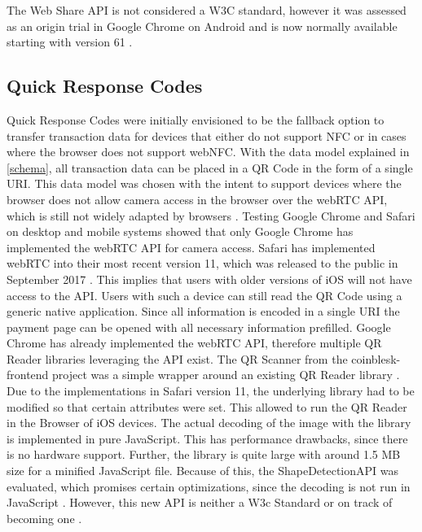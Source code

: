The Web Share API is not considered a W3C standard, however it was assessed as an origin trial in Google Chrome on Android and is now normally available starting with version 61 \cite{webshareapi}\cite{websharespec}.


\subsection{Quick Response Codes}\label{qrcodes}
Quick Response Codes were initially envisioned to be the fallback option to transfer transaction data for devices that either do not support NFC or in cases where the browser does not support webNFC. With the data model explained in \ref{schema}, all transaction data can be placed in a QR Code in the form of a single URI.
This data model was chosen with the intent to support devices where the browser does not allow camera access in the browser over the webRTC API, which is still not widely adapted by browsers \cite{webrtcimplreport}. Testing Google Chrome and Safari on desktop and mobile systems showed that only Google Chrome has implemented the webRTC API for camera access. Safari has  implemented webRTC into their most recent version 11, which was released to the public in September 2017  \cite{safari11release}\cite{ios11release}. This implies that users with older versions of iOS will not have access to the API. Users with such a device can still read the QR Code using a generic native application. Since all information is encoded in a single URI the payment page can be opened with all necessary information prefilled.
Google Chrome has already implemented the webRTC API, therefore multiple QR Reader libraries leveraging the API exist.
The QR Scanner from the coinblesk-frontend project was a simple wrapper around an existing QR Reader library \cite{instascan}. Due to the implementations in Safari version 11, the underlying library had to be modified so that certain attributes were set. This allowed to run the QR Reader in the Browser of iOS devices. The actual decoding of the image with the library is implemented in pure JavaScript. This has performance drawbacks, since there is no hardware support. Further, the library is quite large with around 1.5 MB size for a minified JavaScript file. Because of this, the ShapeDetectionAPI was evaluated, which promises certain optimizations, since the decoding is not run in JavaScript \cite{shapeapinotes}. However, this new API is neither a W3c Standard or on track of becoming one \cite{shapeapispec}.

